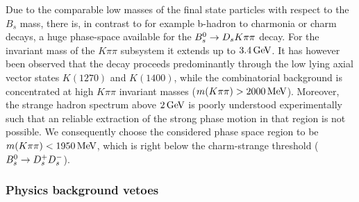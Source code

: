 Due to the comparable low masses of the final state particles  with respect to the $B_s$ mass,
there is, in contrast to for example b-hadron to charmonia or charm decays, a huge phase-space available for the ${{B}^0_{s}}\rightarrow{\ensuremath{{D}_{s}}}{\ensuremath{K}}{\ensuremath{\pi}}{\ensuremath{\pi}}$ decay.
For the invariant mass of the $K\pi\pi$ subsystem it extends up to $3.4 \mathrm{\,Ge\kern -0.1em V}$.
It has however been observed that the decay proceeds predominantly through the low lying axial vector states $K(1270)$ and $K(1400)$, while
the combinatorial background is concentrated at high $K\pi\pi$ invariant masses ($m(K\pi\pi) > 2000 \mathrm{\,Me\kern -0.1em V}$).
Moreover, the strange hadron spectrum above $2\mathrm{\,Ge\kern -0.1em V}$ is poorly understood experimentally such that an reliable extraction of the strong phase motion in that region is not possible.
We consequently choose the considered phase space region to be $m(K\pi\pi) < 1950 \mathrm{\,Me\kern -0.1em V}$, which is right below the charm-strange threshold (${{B}^0_{s}}\rightarrow{\ensuremath{{D}^+_{s}}}{\ensuremath{{D}^-_{s}}}$).
 
 \clearpage
\subsubsection{Physics background vetoes}

